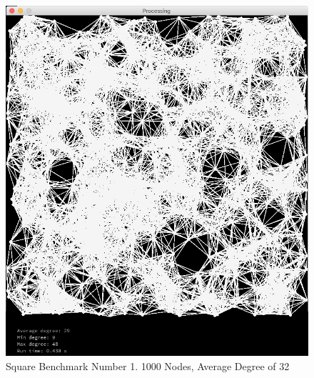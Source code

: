 \documentclass{article}
\begin{document}
\begin{figure}
    \centering
    \includegraphics[scale=0.45]{./images/square_0.png}
    \caption{Square Benchmark Number 1. 1000 Nodes, Average Degree of 32}
    \label{square0}
\end{figure}
\end{document}
